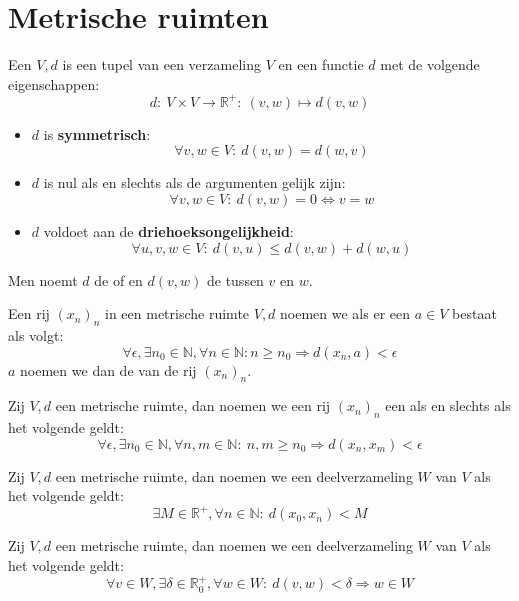 \documentclass[main.tex]{subfiles}
\begin{document}
\section{Metrische ruimten}
\label{sec:metrische-ruimten}

\begin{de}
  Een  $V,d$ is een tupel van een verzameling $V$ en een functie $d$ met de volgende eigenschappen:
  \[ d:\ V \times V \rightarrow \mathbb{R}^{+}:\ (v,w) \mapsto d(v,w) \]
  \begin{itemize}
  \item $d$ is \textbf{symmetrisch}:
    \[ \forall v,w \in V:\ d(v,w) = d(w,v) \]
  \item $d$ is nul als en slechts als de argumenten gelijk zijn:
    \[ \forall v,w \in V:\ d(v,w) = 0 \Leftrightarrow v = w \]
  \item $d$ voldoet aan de \textbf{driehoeksongelijkheid}:
    \[ \forall u,v,w \in V:\ d(v,u) \le d(v,w) + d(w,u) \]
  \end{itemize}
  Men noemt $d$ de  of  en $d(v,w)$ de  tussen $v$ en $w$.
\end{de}

\begin{de}
  Een rij $(x_{n})_{n}$ in een metrische ruimte $V,d$ noemen we  als er een $a\in V$ bestaat als volgt:
  \[ \forall \epsilon, \exists n_{0}\in \mathbb{N}, \forall n\in \mathbb{N}: n \ge n_{0} \Rightarrow d(x_{n},a) < \epsilon \]
  $a$ noemen we dan de  van de rij $(x_{n})_{n}$.
\end{de}

\begin{de}
  Zij $V,d$ een metrische ruimte, dan noemen we een rij $(x_{n})_{n}$ een  als en slechts als het volgende geldt:
  \[ \forall \epsilon, \exists n_{0} \in \mathbb{N}, \forall n,m\in \mathbb{N}:\ n,m\ge n_{0} \Rightarrow d(x_{n},x_{m}) < \epsilon \]
\end{de}

\begin{de}
  Zij $V,d$ een metrische ruimte, dan noemen we een deelverzameling $W$ van $V$  als het volgende geldt:
  \[ \exists M\in \mathbb{R}^{+}, \forall n\in \mathbb{N}:\ d(x_{0},x_{n}) < M \]
\end{de}

\begin{de}
  Zij $V,d$ een metrische ruimte, dan noemen we een deelverzameling $W$ van $V$  als het volgende geldt:
  \[ \forall v\in W, \exists \delta \in \mathbb{R}_{0}^{+}, \forall w\in W:\ d(v,w) < \delta \Rightarrow w \in W \]
\end{de}
\end{document}
